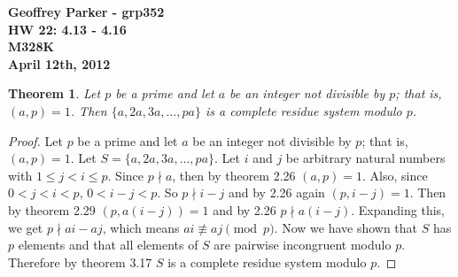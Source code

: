 \documentclass[12pt,leqno]{article}
\numberwithin{equation}{section}
\newtheorem{thm}{Theorem}[section]
\theoremstyle{definition}
\begin{document}
\thispagestyle{plain}
\begin{flushright}
\large{\textbf{Geoffrey Parker - grp352\\
HW 22: 4.13 - 4.16\\
M328K \\
April 12th, 2012 \\}}
\end{flushright}

\markboth{}{} \setcounter{section}{0} \baselineskip=18pt

\setcounter{tocdepth}{4}



\setcounter{section}{4}

\setcounter{thm}{12}


\begin{thm}
Let $p$ be a prime and let $a$ be an integer not divisible by $p$;
that is, $(a, p) = 1$.  Then $\{a, 2a, 3a, \hdots, pa\}$ is a
complete residue system modulo $p$.
\end{thm}
\begin{proof}[Proof]
Let $p$ be a prime and let $a$ be an integer not divisible by $p$; that is, $(a, p) = 1$.  Let $S = \{a, 2a, 3a, \hdots, pa\}$.  Let $i$ and $j$ be arbitrary natural numbers with $1 \leq j < i \leq p$.  Since $p \nmid a$, then by theorem 2.26 $(a, p) = 1$.  Also, since $0 < j < i < p$, $0 < i - j < p$.  So $p \nmid i - j$ and by 2.26 again  $(p, i-j) = 1$.  Then by theorem 2.29 $(p, a(i-j)) = 1$ and by 2.26 $p \nmid a(i-j)$. Expanding this, we get $p \nmid ai - aj$, which means $ai \not \equiv aj \pmod{p}$.  Now we have shown that $S$ has $p$ elements and that all elements of $S$ are pairwise incongruent modulo $p$.  Therefore by theorem 3.17 $S$ is a complete residue system modulo $p$.
\end{proof}

\end{document}

